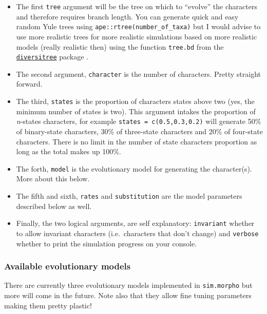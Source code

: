 \documentclass[
]{book}
\providecommand{\tightlist}{%
  \setlength{\itemsep}{0pt}\setlength{\parskip}{0pt}}
\begin{document}
\begin{itemize}
\tightlist
\item
  The first \texttt{tree} argument will be the tree on which to ``evolve'' the characters and therefore requires branch length.
  You can generate quick and easy random Yule trees using \texttt{ape::rtree(number\_of\_taxa)} but I would advise to use more realistic trees for more realistic simulations based on more realistic models (really realistic then) using the function \texttt{tree.bd} from the \href{http://www.zoology.ubc.ca/prog/diversitree/}{\texttt{diversitree}} package \citep{fitzjohndiversitree2012}.
\item
  The second argument, \texttt{character} is the number of characters. Pretty straight forward.
\item
  The third, \texttt{states} is the proportion of characters states above two (yes, the minimum number of states is two). This argument intakes the proportion of \emph{n}-states characters, for example \texttt{states\ =\ c(0.5,0.3,0.2)} will generate 50\% of binary-state characters, 30\% of three-state characters and 20\% of four-state characters. There is no limit in the number of state characters proportion as long as the total makes up 100\%.
\item
  The forth, \texttt{model} is the evolutionary model for generating the character(s). More about this below.
\item
  The fifth and sixth, \texttt{rates} and \texttt{substitution} are the model parameters described below as well.
\item
  Finally, the two logical arguments, are self explanatory: \texttt{invariant} whether to allow invariant characters (i.e.~characters that don't change) and \texttt{verbose} whether to print the simulation progress on your console.
\end{itemize}

\hypertarget{available-evolutionary-models}{%
\subsubsection{Available evolutionary models}\label{available-evolutionary-models}}

There are currently three evolutionary models implemented in \texttt{sim.morpho} but more will come in the future.
Note also that they allow fine tuning parameters making them pretty plastic!
\end{document}
